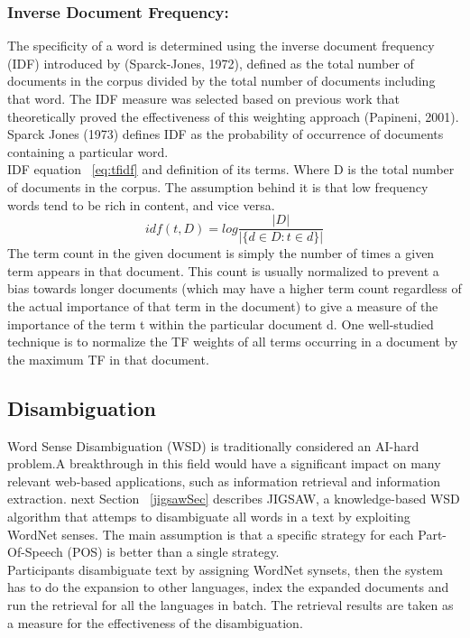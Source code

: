 \subsubsection{Inverse Document Frequency:}
The specificity of a word is determined using the inverse document frequency (IDF) introduced by (Sparck-Jones, 1972), defined as the total number of documents in the corpus divided by the total number of documents including that word. The IDF measure was selected based on previous work that theoretically proved the effectiveness of this weighting approach (Papineni, 2001). Sparck Jones (1973) defines IDF as the probability of occurrence of documents containing a particular word.\\
IDF equation ~\ref{eq:tfidf} and definition of its terms. 
Where D is the total number of documents in the corpus. The assumption behind it is that low frequency words tend to be rich in content, and vice versa.
\begin{equation} \label{eq:tfidf}
idf(t,D) = log \frac{|D|}{|\{d \in D: t \in d\}|}
\end{equation}
The term count in the given document is simply the number of times a given term appears in that document. This count is usually normalized to prevent a bias towards longer documents (which may have a higher term count regardless of the actual importance of that term in the document) to give a measure of the importance of the term t within the particular document d. One well-studied technique is to normalize the TF weights of all terms occurring in a document by the maximum TF in that document\citep{tfidf_1}.\\
\subsection{Disambiguation}                                            
Word Sense Disambiguation (WSD) is traditionally considered an AI-hard problem.A breakthrough in this field would have a significant impact on many relevant web-based applications, such as information retrieval and information extraction. next Section ~\ref{jigsawSec} describes JIGSAW, a knowledge-based  WSD algorithm that attemps to disambiguate all words in a text by exploiting WordNet senses. The main assumption is that a specific strategy for each Part-Of-Speech (POS)  is better than a single strategy.\\
Participants disambiguate text by assigning WordNet synsets, then the  system has to do the expansion to other languages, index the expanded documents and run the retrieval for all the languages in batch. The retrieval results are taken as a measure for the effectiveness of the disambiguation.

